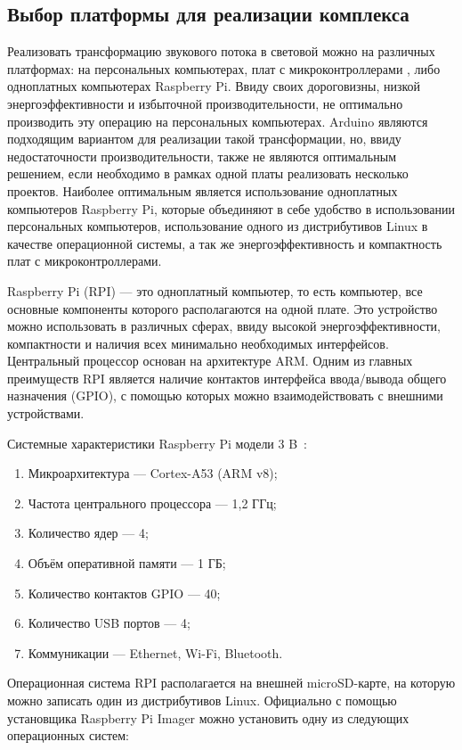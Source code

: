 \subsection{Выбор платформы для реализации комплекса}

Реализовать трансформацию звукового потока в световой можно на различных платформах: на персональных компьютерах, плат с микроконтроллерами , либо одноплатных компьютерах Raspberry Pi. Ввиду своих дороговизны, низкой энергоэффективности и избыточной производительности, не оптимально производить эту операцию на персональных компьютерах. Arduino являются подходящим вариантом для реализации такой трансформации, но, ввиду недостаточности производительности, также не являются оптимальным решением, если необходимо в рамках одной платы реализовать несколько проектов. Наиболее оптимальным является использование одноплатных компьютеров Raspberry Pi, которые объединяют в себе удобство в использовании персональных компьютеров, использование одного из дистрибутивов Linux в качестве операционной системы, а так же энергоэффективность и компактность плат с микроконтроллерами.

Raspberry Pi (RPI) --- это одноплатный компьютер, то есть компьютер, все основные компоненты которого располагаются на одной плате. Это устройство можно использовать в различных сферах, ввиду высокой энергоэффективности, компактности и наличия всех минимально необходимых интерфейсов. Центральный процессор основан на архитектуре ARM. Одним из главных преимуществ RPI является наличие контактов интерфейса ввода/вывода общего назначения (GPIO), с помощью которых можно взаимодействовать с внешними устройствами.

Системные характеристики Raspberry Pi модели 3 B~\cite{rpi-site}:

\begin{enumerate}
  \item Микроархитектура --- Cortex-A53 (ARM v8);
  \item Частота центрального процессора --- 1,2 ГГц;
  \item Количество ядер --- 4;
  \item Объём оперативной памяти --- 1 ГБ;
  \item Количество контактов GPIO --- 40;
  \item Количество USB портов --- 4;
  \item Коммуникации --- Ethernet, Wi-Fi, Bluetooth.
\end{enumerate}

Операционная система RPI располагается на внешней microSD-карте, на которую можно записать один из дистрибутивов Linux. Официально с помощью установщика Raspberry Pi Imager можно установить одну из следующих операционных систем:

